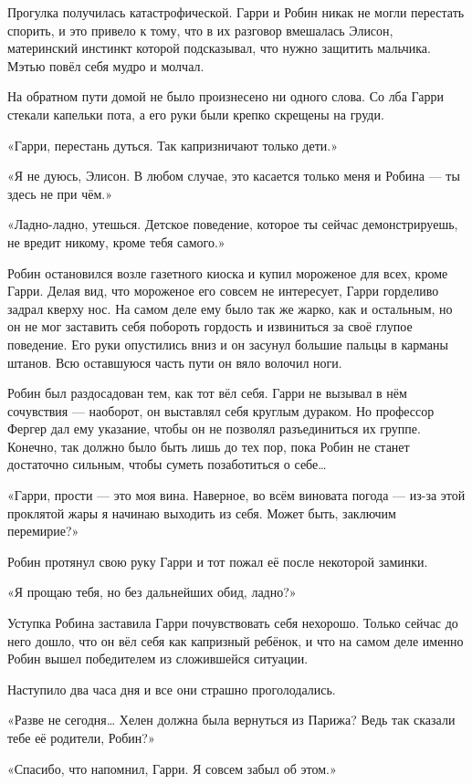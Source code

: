 \documentclass[a5paper, 9pt,
final, openany, twoside=true]{memoir}
\begin{document}
Прогулка получилась катастрофической. Гарри и Робин никак не могли перестать спорить, и это привело к тому, что в их разговор вмешалась Элисон, материнский инстинкт которой подсказывал, что нужно защитить мальчика. Мэтью повёл себя мудро и молчал.

На обратном пути домой не было произнесено ни одного слова. Со лба Гарри стекали капельки пота, а его руки были крепко скрещены на груди.

«Гарри, перестань дуться. Так капризничают только дети.»

«Я не дуюсь, Элисон. В любом случае, это касается только меня и Робина — ты здесь не при чём.»

«Ладно-ладно, утешься. Детское поведение, которое ты сейчас демонстрируешь, не вредит никому, кроме тебя самого.»

Робин остановился возле газетного киоска и купил мороженое для всех, кроме Гарри. Делая вид, что мороженое его совсем не интересует, Гарри горделиво задрал кверху нос. На самом деле ему было так же жарко, как и остальным, но он не мог заставить себя побороть гордость и извиниться за своё глупое поведение. Его руки опустились вниз и он засунул большие пальцы в карманы штанов. Всю оставшуюся часть пути он вяло волочил ноги.

Робин был раздосадован тем, как тот вёл себя. Гарри не вызывал в нём сочувствия — наоборот, он выставлял себя круглым дураком. Но профессор Фергер дал ему указание, чтобы он не позволял разъединиться их группе. Конечно, так должно было быть лишь до тех пор, пока Робин не станет достаточно сильным, чтобы суметь позаботиться о себе…\bigskip

«Гарри, прости — это моя вина. Наверное, во всём виновата погода — из-за этой проклятой жары я начинаю выходить из себя. Может быть, заключим перемирие?»

Робин протянул свою руку Гарри и тот пожал её после некоторой заминки.

«Я прощаю тебя, но без дальнейших обид, ладно?»

Уступка Робина заставила Гарри почувствовать себя нехорошо. Только сейчас до него дошло, что он вёл себя как капризный ребёнок, и что на самом деле именно Робин вышел победителем из сложившейся ситуации.

Наступило два часа дня и все они страшно проголодались.

«Разве не сегодня… Хелен должна была вернуться из Парижа? Ведь так сказали тебе её родители, Робин?»

«Спасибо, что напомнил, Гарри. Я совсем забыл об этом.»
\end{document}
